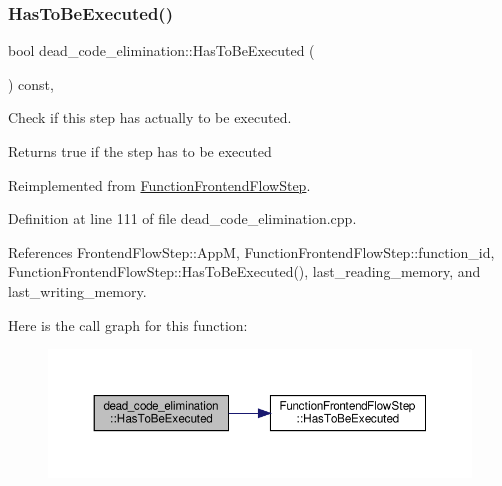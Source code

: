 \subsubsection{\texorpdfstring{Has\+To\+Be\+Executed()}{HasToBeExecuted()}}
{\footnotesize\ttfamily bool dead\+\_\+code\+\_\+elimination\+::\+Has\+To\+Be\+Executed (\begin{DoxyParamCaption}{ }\end{DoxyParamCaption}) const\hspace{0.3cm}{\ttfamily [override]}, {\ttfamily [virtual]}}



Check if this step has actually to be executed. 

\begin{DoxyReturn}{Returns}
true if the step has to be executed 
\end{DoxyReturn}


Reimplemented from \hyperlink{classFunctionFrontendFlowStep_a12e786363530aa9533e4bd9380130d75}{Function\+Frontend\+Flow\+Step}.



Definition at line 111 of file dead\+\_\+code\+\_\+elimination.\+cpp.



References Frontend\+Flow\+Step\+::\+AppM, Function\+Frontend\+Flow\+Step\+::function\+\_\+id, Function\+Frontend\+Flow\+Step\+::\+Has\+To\+Be\+Executed(), last\+\_\+reading\+\_\+memory, and last\+\_\+writing\+\_\+memory.

Here is the call graph for this function\+:
\nopagebreak
\begin{figure}[H]
\begin{center}
\leavevmode
\includegraphics[width=350pt]{d5/d8b/classdead__code__elimination_aa7771fdf8a82f2e274bf0cfe44edf553_cgraph}
\end{center}
\end{figure}
\mbox{\label{classdead__code__elimination_a49b1c6bb467f000a41973440b21180ac}} 
